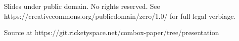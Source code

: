 
\begin{frame}[fragile]

  {\tiny
  \begin{semiverbatim}
    Slides under public domain. No rights reserved. See
    https://creativecommons.org/publicdomain/zero/1.0/ for full
    legal verbiage.

    Source at https://git.ricketyspace.net/combox-paper/tree/presentation
  \end{semiverbatim}
  }
\end{frame}
